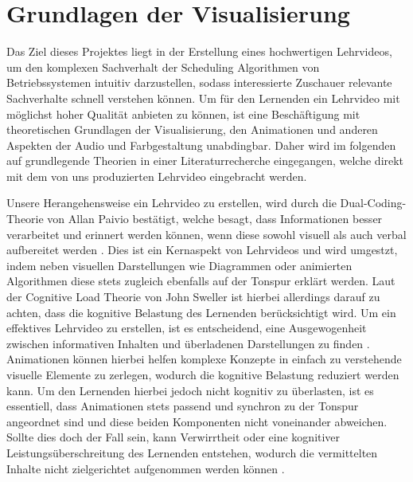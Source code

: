 
\chapter{Grundlagen der Visualisierung}
Das Ziel dieses Projektes liegt in der Erstellung eines hochwertigen Lehrvideos, um den komplexen Sachverhalt der Scheduling Algorithmen von Betriebssystemen intuitiv darzustellen, sodass interessierte Zuschauer relevante Sachverhalte schnell verstehen können. Um für den Lernenden ein Lehrvideo mit möglichst hoher Qualität anbieten zu können, ist eine Beschäftigung mit theoretischen Grundlagen der Visualisierung, den Animationen und anderen Aspekten der Audio und Farbgestaltung unabdingbar. Daher wird im folgenden auf grundlegende Theorien in einer Literaturrecherche eingegangen, welche direkt mit dem von uns produzierten Lehrvideo eingebracht werden. 

Unsere Herangehensweise ein Lehrvideo zu erstellen, wird durch die Dual-Coding-Theorie von Allan Paivio bestätigt, welche besagt, dass Informationen besser verarbeitet und erinnert werden können, wenn diese sowohl visuell als auch verbal aufbereitet werden \autocite{paivio_dual_1991}. Dies ist ein Kernaspekt von Lehrvideos und wird umgestzt, indem neben visuellen Darstellungen wie Diagrammen oder animierten Algorithmen diese stets zugleich ebenfalls auf der Tonspur erklärt werden. Laut der Cognitive Load Theorie von John Sweller ist hierbei allerdings darauf zu achten, dass die kognitive Belastung des Lernenden berücksichtigt wird. Um ein effektives Lehrvideo zu erstellen, ist es entscheidend, eine Ausgewogenheit zwischen informativen Inhalten und überladenen Darstellungen zu finden \autocite{sweller_cognitive_2011}. 
Animationen können hierbei helfen komplexe Konzepte in einfach zu verstehende visuelle Elemente zu zerlegen, wodurch die kognitive Belastung reduziert werden kann. Um den Lernenden hierbei jedoch nicht kognitiv zu überlasten, ist es essentiell, dass Animationen stets passend und synchron zu der Tonspur angeordnet sind und diese beiden Komponenten nicht voneinander abweichen. Sollte dies doch der Fall sein, kann Verwirrtheit oder eine kognitiver Leistungsüberschreitung des Lernenden entstehen, wodurch die vermittelten Inhalte nicht zielgerichtet aufgenommen werden können \autocite{sweller_cognitive_2011}. 

